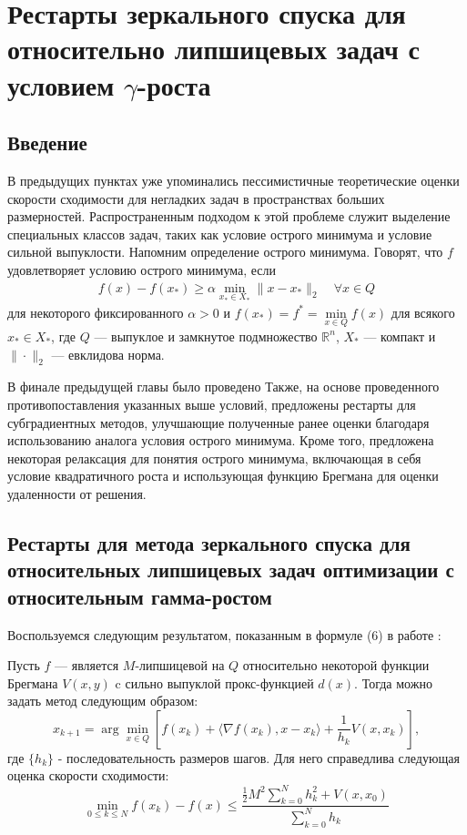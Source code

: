 \chapter{Рестарты зеркального спуска для относительно липшицевых задач с условием $\gamma$-роста}\label{ch:ch3}

\section{Введение}\label{sec:ch3/sect1}

    В предыдущих пунктах уже упоминались пессимистичные теоретические оценки скорости сходимости для негладких задач в пространствах больших размерностей. Распространенным подходом к этой проблеме служит выделение специальных классов задач, таких как условие острого минимума \cite{6, 1} и условие сильной выпуклости. Напомним определение острого минимума. Говорят, что $f$ удовлетворяет условию острого минимума, если
    \begin{gather}\label{sm}
    f(x) - f(x_*) \geq \alpha \min_{x_* \in X_*} \|x- x_*\|_2 \quad \forall x \in Q
    \end{gather}
    для некоторого фиксированного $\alpha >0$ и $f(x_*) = f^* = \min\limits_{x\in Q} f(x)$ для всякого $x_* \in X_*$, где $Q$ --- выпуклое и замкнутое подмножество $\mathbb{R}^n$, $X_*$ --- компакт и $\|\cdot\|_2$ --- евклидова норма. 

    В финале предыдущей главы было проведено Также, на основе проведенного противопоставления указанных выше условий, предложены рестарты для субградиентных методов, улучшающие полученные ранее оценки благодаря использованию аналога условия острого минимума.  Кроме того, предложена некоторая релаксация для понятия острого минимума, включающая в себя условие квадратичного роста и использующая функцию Брегмана для оценки удаленности от решения. 

\section{Рестарты для метода зеркального спуска для относительных липшицевых задач оптимизации с относительным гамма-ростом}\label{sec:ch3/sect3}
    Воспользуемся следующим результатом, показанным в формуле (6) в работе \cite{Lu_2018}:
    \begin{theorem} \label{vanilla_mirror}
        Пусть $f$ --- является $M$-липшицевой на $Q$ относительно некоторой функции Брегмана $V(x, y)$ c сильно выпуклой прокс-функцией $d(x)$. Тогда можно задать метод следующим образом:
        \begin{equation} \label{mirr_upd}
            x_{k+1} = \arg \min_{x \in Q} {\left[ f(x_k) + \langle \nabla f(x_k), x - x_k \rangle + \frac{1}{h_k} V(x, x_k)\right]},
        \end{equation}
        где $\{ h_k \}$ - последовательность размеров шагов.
        Для него справедлива следующая оценка скорости сходимости:
        \begin{equation} \label{general_est}
            \min_{0\leq k \leq N} f(x_k) - f(x) \leq \frac{\frac{1}{2} M^2 \sum_{k=0}^N h_k^2 + V(x, x_0)}{\sum_{k=0}^N h_k}
        \end{equation}
    \end{theorem}

